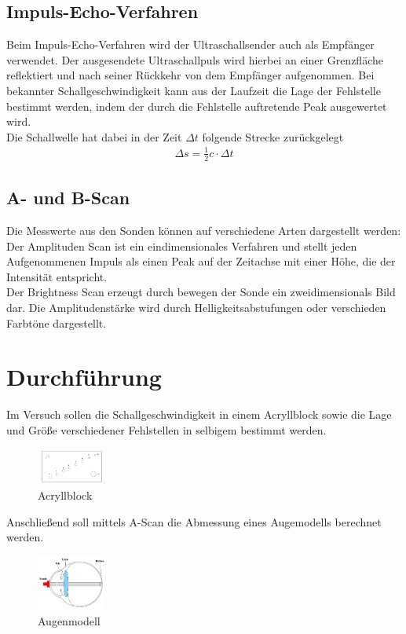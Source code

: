 \subsection{Impuls-Echo-Verfahren}
Beim Impuls-Echo-Verfahren wird der Ultraschallsender auch als Empfänger verwendet. Der ausgesendete Ultraschallpuls wird hierbei an einer Grenzfläche reflektiert und nach seiner Rückkehr von dem Empfänger aufgenommen. Bei bekannter Schallgeschwindigkeit kann aus der Laufzeit die Lage der Fehlstelle bestimmt werden, indem der durch die Fehlstelle auftretende Peak ausgewertet wird.\\
Die Schallwelle hat dabei in der Zeit $\Delta t$ folgende Strecke zurückgelegt
\begin{align}
	\Delta s = \frac{1}{2} c \cdot \Delta t
	\label{eq_strecke}
\end{align}

\subsection{A- und B-Scan}
Die Messwerte aus den Sonden können auf verschiedene Arten dargestellt werden:\\

Der Amplituden Scan ist ein eindimensionales Verfahren und stellt jeden Aufgenommenen Impuls als einen Peak auf der Zeitachse mit einer Höhe, die der Intensität entspricht.\\

Der Brightness Scan erzeugt durch bewegen der Sonde ein zweidimensionals Bild dar. Die Amplitudenstärke wird durch Helligkeitsabstufungen oder verschieden Farbtöne dargestellt.


\section{Durchführung}
Im Versuch sollen die Schallgeschwindigkeit in einem Acryllblock sowie die Lage und Größe verschiedener Fehlstellen in selbigem bestimmt werden. 
\begin{figure}
\includegraphics[width=0.2\textwidth]{pics/block.jpg}
\caption{\mbox{Acryllblock}}
\end{figure}
Anschließend soll mittels A-Scan die Abmessung eines Augemodells berechnet werden.

\begin{figure}
\includegraphics[width=0.2\textwidth]{pics/auge.jpg}
\caption{\mbox{Augenmodell}}
\end{figure}

